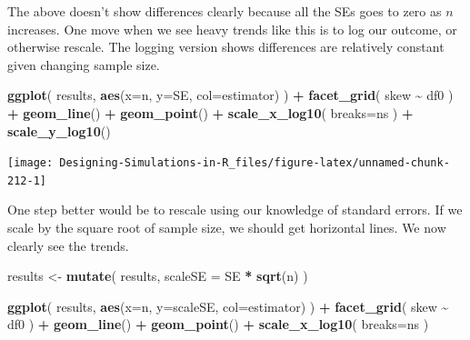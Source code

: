 \documentclass[
]{book}
\newenvironment{Shaded}{\begin{snugshade}}{\end{snugshade}}
\newcommand{\AttributeTok}[1]{\textcolor[rgb]{0.13,0.29,0.53}{#1}}
\newcommand{\FunctionTok}[1]{\textcolor[rgb]{0.13,0.29,0.53}{\textbf{#1}}}
\newcommand{\NormalTok}[1]{#1}
\newcommand{\OtherTok}[1]{\textcolor[rgb]{0.56,0.35,0.01}{#1}}
\newcommand{\SpecialCharTok}[1]{\textcolor[rgb]{0.81,0.36,0.00}{\textbf{#1}}}
\begin{document}
The above doesn't show differences clearly because all the SEs goes to zero as \(n\) increases.
One move when we see heavy trends like this is to log our outcome, or otherwise rescale. The logging version shows differences are relatively constant given changing sample size.

\begin{Shaded}
\begin{Highlighting}[]
\FunctionTok{ggplot}\NormalTok{( results, }\FunctionTok{aes}\NormalTok{(}\AttributeTok{x=}\NormalTok{n, }\AttributeTok{y=}\NormalTok{SE, }\AttributeTok{col=}\NormalTok{estimator) ) }\SpecialCharTok{+}
  \FunctionTok{facet\_grid}\NormalTok{( skew }\SpecialCharTok{\textasciitilde{}}\NormalTok{ df0 ) }\SpecialCharTok{+}
  \FunctionTok{geom\_line}\NormalTok{() }\SpecialCharTok{+} \FunctionTok{geom\_point}\NormalTok{() }\SpecialCharTok{+}
  \FunctionTok{scale\_x\_log10}\NormalTok{( }\AttributeTok{breaks=}\NormalTok{ns ) }\SpecialCharTok{+}
  \FunctionTok{scale\_y\_log10}\NormalTok{()}
\end{Highlighting}
\end{Shaded}

\begin{center}\texttt{[image: Designing-Simulations-in-R\_files/figure-latex/unnamed-chunk-212-1]} \end{center}

One step better would be to rescale using our knowledge of standard errors.
If we scale by the square root of sample size, we should get horizontal lines.
We now clearly see the trends.

\begin{Shaded}
\begin{Highlighting}[]
\NormalTok{results }\OtherTok{\textless{}{-}} \FunctionTok{mutate}\NormalTok{( results, }\AttributeTok{scaleSE =}\NormalTok{ SE }\SpecialCharTok{*} \FunctionTok{sqrt}\NormalTok{(n) )}
\end{Highlighting}
\end{Shaded}

\begin{Shaded}
\begin{Highlighting}[]
\FunctionTok{ggplot}\NormalTok{( results, }\FunctionTok{aes}\NormalTok{(}\AttributeTok{x=}\NormalTok{n, }\AttributeTok{y=}\NormalTok{scaleSE, }\AttributeTok{col=}\NormalTok{estimator) ) }\SpecialCharTok{+}
  \FunctionTok{facet\_grid}\NormalTok{( skew }\SpecialCharTok{\textasciitilde{}}\NormalTok{ df0 ) }\SpecialCharTok{+}
    \FunctionTok{geom\_line}\NormalTok{() }\SpecialCharTok{+} \FunctionTok{geom\_point}\NormalTok{() }\SpecialCharTok{+}
    \FunctionTok{scale\_x\_log10}\NormalTok{( }\AttributeTok{breaks=}\NormalTok{ns )}
\end{Highlighting}
\end{Shaded}
\end{document}
